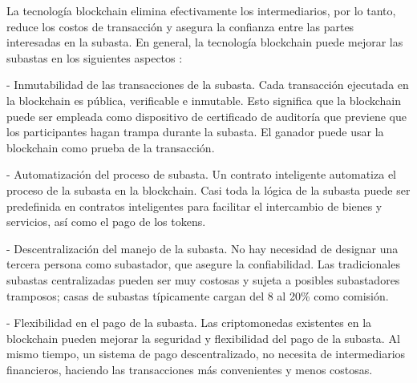 
  La tecnología blockchain elimina efectivamente los intermediarios, por lo tanto, reduce los costos de 
  transacción y asegura la confianza entre las partes interesadas en la subasta. En general, la tecnología
  blockchain puede mejorar las subastas en los siguientes aspectos \parencite{shi2021}:
  
  - Inmutabilidad de las transacciones de la subasta. Cada transacción ejecutada en la blockchain es pública, verificable e inmutable.
  Esto significa que la blockchain puede ser empleada como dispositivo de certificado de auditoría que previene que los participantes
  hagan trampa durante la subasta. El ganador puede usar la blockchain como prueba de la transacción.
  
  - Automatización del proceso de subasta. Un contrato inteligente automatiza el proceso de la subasta en la blockchain. Casi toda 
  la lógica de la subasta puede ser predefinida en contratos inteligentes para facilitar el intercambio de bienes y servicios, así como
  el pago de los tokens.

  - Descentralización del manejo de la subasta. No hay necesidad de designar una tercera persona como subastador, que asegure la 
  confiabilidad. Las tradicionales subastas centralizadas pueden ser muy costosas y sujeta a posibles subastadores tramposos; casas
  de subastas típicamente cargan del 8 al 20\% como comisión. 

  - Flexibilidad en el pago de la subasta. Las criptomonedas existentes en la blockchain pueden mejorar la seguridad y flexibilidad
  del pago de la subasta. Al mismo tiempo, un sistema de pago descentralizado, no necesita de intermediarios financieros, haciendo
  las transacciones más convenientes y menos costosas. %

